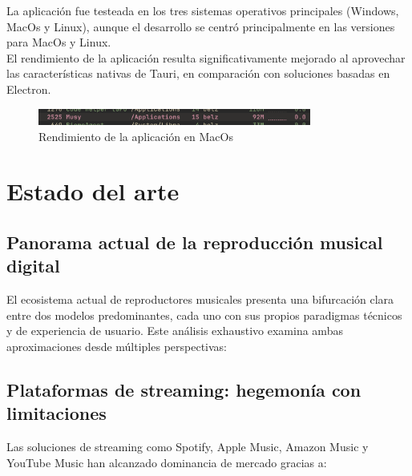 \documentclass[11pt, a4paper]{article}
\begin{document}
        La aplicación fue testeada en los tres sistemas operativos principales (Windows, MacOs y Linux), aunque el desarrollo se centró principalmente en las versiones para MacOs y Linux. \\

        El rendimiento de la aplicación resulta significativamente mejorado al aprovechar las características nativas de Tauri, en comparación con soluciones basadas en Electron. \\

        \begin{figure}[h!]
            \centering
            \includegraphics[width=0.8\textwidth]{media/imagemusyram.png}
            \caption{Rendimiento de la aplicación en MacOs}
            \label{fig:ejemplo}
        \end{figure}

\section{Estado del arte}

  \subsection{Panorama actual de la reproducción musical digital}

  El ecosistema actual de reproductores musicales presenta una bifurcación clara entre dos modelos predominantes, cada uno con sus propios paradigmas técnicos y de experiencia de usuario. Este análisis exhaustivo examina ambas aproximaciones desde múltiples perspectivas:

  \subsection{Plataformas de streaming: hegemonía con limitaciones}

  Las soluciones de streaming como Spotify, Apple Music, Amazon Music y YouTube Music han alcanzado dominancia de mercado gracias a:
\end{document}
